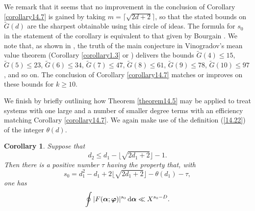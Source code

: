 \documentclass[12pt,reqno]{amsart}
\newtheorem{corollary}[theorem]{Corollary}
\theoremstyle{definition}
\theoremstyle{remark}
\numberwithin{equation}{section}
\def\Gtil{\widetilde G}\def\Itil{\widetilde I}\def\Ktil{\widetilde K}
\def\tet{{\theta}} \def\bftet{{\boldsymbol \theta}}
\def\le{\leqslant} \def\ge{\geqslant} \def\pleq{\preccurlyeq} \def\ple{\prec}
\def\d{{\,{\rm d}}}
\begin{document}
We remark that it seems that no improvement in the conclusion of Corollary 
\ref{corollary14.7} is gained by taking $m=\lceil \sqrt{2d+2}\rceil$, so that the stated 
bounds on $\Gtil(d)$ are the sharpest obtainable using this circle of ideas. The formula for 
$s_0$ in the statement of the corollary is equivalent to that given by Bourgain 
\cite[Theorem 11]{Bou2017}. We note that, as shown in \cite[Theorem 4.1]{Woo2012b}, 
the truth of the main conjecture in Vinogradov's mean value theorem (Corollary 
\ref{corollary1.3} or \cite{BDG2016}) delivers the bounds $\Gtil(4)\le 15$, $\Gtil(5)\le 23$, 
$\Gtil(6)\le 34$, $\Gtil(7)\le 47$, $\Gtil(8)\le 61$, $\Gtil(9)\le 78$, $\Gtil(10)\le 97$, and so 
on. The conclusion of Corollary \ref{corollary14.7} matches or improves on these bounds for 
$k\ge 10$.\par

We finish by briefly outlining how Theorem \ref{theorem14.5} may be applied to treat 
systems with one large and a number of smaller degree terms with an efficiency matching 
Corollary \ref{corollary14.7}. We again make use of the definition (\ref{14.22}) of the 
integer $\tet(d)$.

\begin{corollary}\label{corollary14.8} Suppose that
\begin{equation}\label{14.25}
d_2\le d_1-\lfloor \sqrt{2d_1+2}\rfloor-1.
\end{equation}
Then there is a positive number $\tau$ having the property that, with
$$s_0=d_1^2-d_1+2\lfloor \sqrt{2d_1+2}\rfloor -\tet(d_1)-\tau,$$
one has
$$\oint |F(\bfalp;\bfvarphi)|^{s_0}\d\bfalp \ll X^{s_0-D}.$$
\end{corollary}
\end{document}
